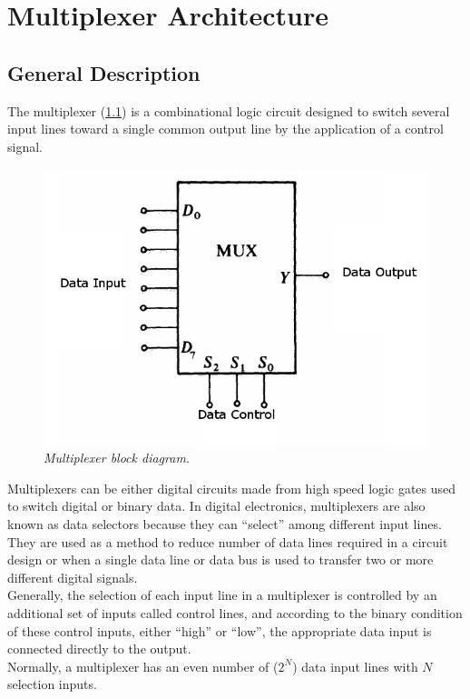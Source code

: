 \chapter{Multiplexer Architecture}
\section{General Description}
The multiplexer (\ref{mux_blocchi}) is a combinational logic circuit designed to switch several input lines toward a single common output line by the application of a control signal.\\
\begin{figure}[!h]
	\centering
	\includegraphics[scale=0.5]{immagini/mux_blocchi.png}
	\caption{\textit{Multiplexer block diagram.}} 
	\label{mux_blocchi}
\end{figure}
\newline
Multiplexers can be either digital circuits made from high speed logic gates used to switch digital or binary data.
In digital electronics, multiplexers are also known as data selectors because they can “select” among different input lines.
They are used as a method to reduce number of data lines required in a circuit design or when a single data line or data bus is used to transfer two or more different digital signals.\\
Generally, the selection of each input line in a multiplexer is controlled by an additional set of inputs called control lines, and according to the binary condition of these control inputs, either “high” or “low”, the appropriate data input is connected directly to the output.\\
Normally, a multiplexer has an even number of ($2^N$) data input lines with $N$ selection inputs.\\
